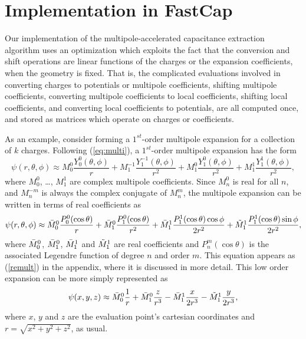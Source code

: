 \section{Implementation in FastCap}
\label{ressec}

Our implementation of the multipole-accelerated capacitance extraction
algorithm uses an optimization which exploits the fact that the
conversion and shift operations are linear functions of the charges or
the expansion coefficients, when the geometry is fixed.  That is, the
complicated evaluations involved in converting charges to potentials
or multipole coefficients, shifting multipole coefficients, converting
multipole coefficients to local coefficients, shifting local
coefficients, and converting local coefficients to potentials, are all
computed once, and stored as matrices which operate on charges or
coefficients.  

As an example, consider forming a $1^{st}$-order multipole
expansion
for a collection of $k$ charges.
Following (\ref{eq:multi}), a  $1^{st}$-order multipole expansion has the form
\begin{equation}
\psi(r, \theta , \phi ) \approx
M^0_0\frac{Y^0_0(\theta, \phi)}{r} 
+M^{-1}_1\frac{Y^{-1}_1(\theta, \phi)}{r^2} 
+M^0_1\frac{Y^0_1(\theta, \phi)}{r^2} 
+M^{1}_1\frac{Y^1_1(\theta, \phi)}{r^2},
\label{nmulti}
\end{equation}
where $M^0_0$, \ldots, $M^1_1$ are complex multipole coefficients.
Since $M_n^0$ is real for all $n$, and 
$M_n^{-m}$ is always  the complex conjugate of $M_n^m$,
the multipole expansion can be written in terms of real coefficients as
\begin{equation}
\psi(r, \theta, \phi) \approx
\mbox{$\bar{M}_{0}^{0}$}\frac{P^0_0(\cos\theta)}{r}
+\mbox{$\bar{M}_{1}^{0}$}\frac{P^0_1(\cos\theta)}{r^2}
+\mbox{$\bar{M}_{1}^{1}$}\frac{P^1_1(\cos\theta)\cos\phi}{2r^2}
+\mbox{$\tilde{M}_{1}^{1}$}\frac{P^1_1(\cos\theta)\sin\phi}{2r^2},
\label{sphmul}
\end{equation}
where $\mbox{$\bar{M}_{0}^{0}$}$, $\mbox{$\bar{M}_{1}^{0}$}$, $\mbox{$\bar{M}_{1}^{1}$}$ and $\mbox{$\tilde{M}_{1}^{1}$}$ are real 
coefficients and $P_n^m(\cos\theta)$ is the associated
Legendre function of degree $n$ and order $m$.
This equation appears as (\ref{remult}) in  %
the appendix,
where it is discussed
in more detail. This low order expansion can be more simply represented as
\begin{equation}
\psi(x, y, z)\approx
\mbox{$\bar{M}_{0}^{0}$}\frac{1}{r}
+\mbox{$\bar{M}_{1}^{0}$}\frac{z}{r^3}
-\mbox{$\bar{M}_{1}^{1}$}\frac{x}{2r^3}
-\mbox{$\tilde{M}_{1}^{1}$}\frac{y}{2r^3},
\end{equation}
where $x$, $y$ and $z$ are the evaluation point's cartesian coordinates
and $r = \sqrt{x^2+y^2+z^2}$, as usual.

